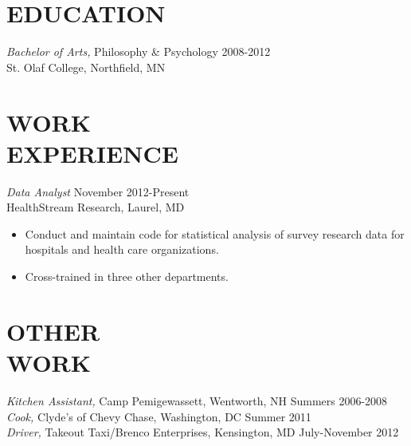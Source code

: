 \documentclass[line,margin]{res}
\begin{document}
\address{38 South Paca Street, Unit 604, Baltimore, MD 21201}
\address{(240) 396-7570 | c.smith.brian@gmail.com}

 
\begin{resume}
 

 
 
\section{EDUCATION} 
		{\sl Bachelor of Arts,} Philosophy \& Psychology \hfill 2008-2012 \\ 
                St. Olaf College, Northfield, MN \\
                
                
 \section{WORK\\EXPERIENCE}  
		{\sl Data Analyst} \hfill	November 2012-Present\\
		HealthStream Research, Laurel, MD
		\begin{itemize}
		 \item Conduct and maintain code for statistical analysis of survey research data for hospitals and health care organizations.
		 \item Cross-trained in three other departments.

		 \end{itemize}
 \section{OTHER\\WORK}
                {\sl Kitchen Assistant,} Camp Pemigewassett, Wentworth, NH  \hfill        Summers 2006-2008 \\
                {\sl Cook,} Clyde's of Chevy Chase, Washington, DC \hfill        Summer 2011 \\
		{\sl Driver,} Takeout Taxi/Brenco Enterprises, Kensington, MD  \hfill        July-November 2012 \\

\end{resume}
\end{document}
